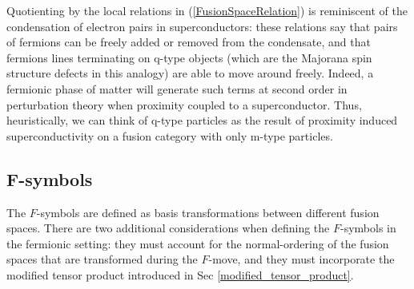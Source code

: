 \documentclass[12pt,a4paper]{article}
\begin{document}
Quotienting by the local relations in (\ref{FusionSpaceRelation}) is reminiscent of the condensation of electron pairs in superconductors: these relations say that pairs of fermions can be freely added or removed from the condensate, and that fermions lines terminating on q-type objects (which are the Majorana spin structure defects in this analogy) are able to move around freely. 
Indeed, a fermionic phase of matter will generate such terms at second order in perturbation theory when proximity coupled to a superconductor.
Thus, heuristically, we can think of q-type particles as the result of proximity induced superconductivity on a fusion category with only m-type particles.


\subsection{F-symbols} \label{Fsymbols}

The $F$-symbols are defined as basis transformations between different fusion spaces. 
There are two additional considerations when defining the $F$-symbols in the fermionic setting: they must account for the normal-ordering of the fusion spaces that are transformed during the $F$-move, and they must incorporate the modified tensor product introduced in Sec \ref{modified_tensor_product}. 
\end{document}
